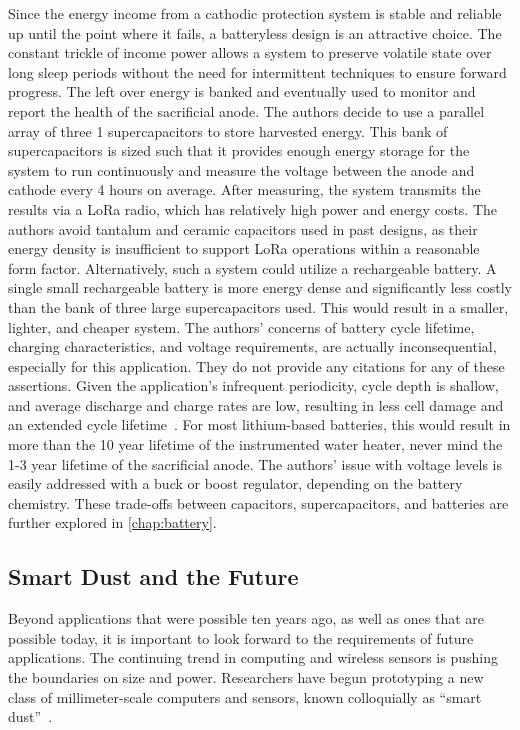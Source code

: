 Since the energy income from a cathodic protection system is stable and reliable up until the point where it fails, a batteryless design is an attractive choice.
The constant trickle of income power allows a system to preserve volatile state over long sleep periods without the need for intermittent techniques to ensure forward progress.
The left over energy is banked and eventually used to monitor and report the health of the sacrificial anode.
The authors decide to use a parallel array of three 1\ssi{\farad} supercapacitors to store harvested energy.
This bank of supercapacitors is sized such that it provides enough energy storage for the system to run continuously and measure the voltage between the anode and cathode every 4 hours on average.
After measuring, the system transmits the results via a LoRa radio, which has relatively high power and energy costs.
The authors avoid tantalum and ceramic capacitors used in past designs, as their energy density is insufficient to support LoRa operations within a reasonable form factor.
Alternatively, such a system could utilize a rechargeable battery.
A single small rechargeable battery is more energy dense and significantly less costly than the bank of three large supercapacitors used.
This would result in a smaller, lighter, and cheaper system.
The authors' concerns of battery cycle lifetime, charging characteristics, and voltage requirements, are actually inconsequential, especially for this application.
They do not provide any citations for any of these assertions.
Given the application's infrequent periodicity, cycle depth is shallow, and average discharge and charge rates are low, resulting in less cell damage and an extended cycle lifetime~\cite{omarLithium14,wangCycle11}.
For most lithium-based batteries, this would result in more than the 10 year lifetime of the instrumented water heater, never mind the 1-3 year lifetime of the sacrificial anode.
The authors' issue with voltage levels is easily addressed with a buck or boost regulator, depending on the battery chemistry.
These trade-offs between capacitors, supercapacitors, and batteries are further explored in \cref{chap:battery}.

\subsection{Smart Dust and the Future}
Beyond applications that were possible ten years ago, as well as ones that are possible today, it is important to look forward to the requirements of future applications.
The continuing trend in computing and wireless sensors is pushing the boundaries on size and power.
Researchers have begun prototyping a new class of
millimeter-scale computers and sensors, known colloquially as ``smart dust''~\cite{warneke2001smart}.

